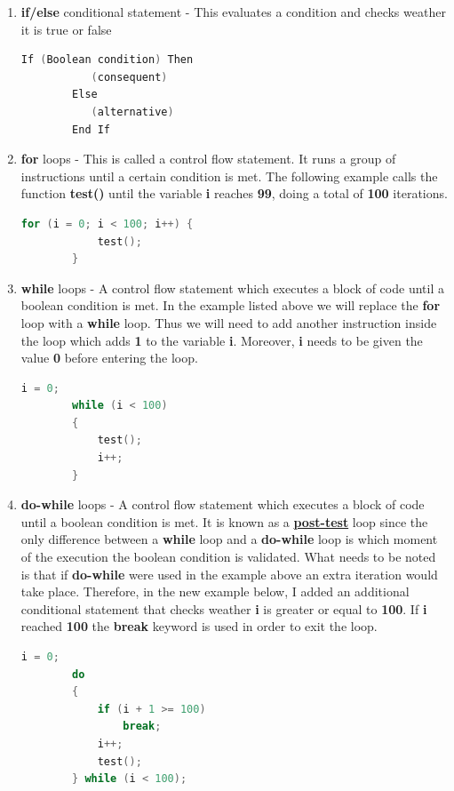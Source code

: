 \documentclass[12pt]{article}
\begin{document}
\begin{enumerate}
    \item \textbf{if/else} conditional statement - This evaluates a condition and checks weather it is true or false
    \begin{lstlisting}[language=C]
        If (Boolean condition) Then
           (consequent)
        Else
           (alternative)
        End If
    \end{lstlisting}

    \item \textbf{for} loops - This is called a control flow statement. It runs a group of instructions until a certain condition is met. The following example calls the function \textbf{test()} until the variable \textbf{i} reaches \textbf{99}, doing a total of \textbf{100} iterations.
    \begin{lstlisting}[language=C]
        for (i = 0; i < 100; i++) {
            test();
        }
    \end{lstlisting}

    \item \textbf{while} loops - A control flow statement which executes a block of code until a boolean condition is met. In the example listed above we will replace the \textbf{for} loop with a \textbf{while} loop. Thus we will need to add another instruction inside the loop which adds \textbf{1} to the variable \textbf{i}. Moreover, \textbf{i} needs to be given the value \textbf{0} before entering the loop.
    \begin{lstlisting}[language=C]
        i = 0;
        while (i < 100)
        {
            test();
            i++;
        }
    \end{lstlisting}

    \item \textbf{do-while} loops - A control flow statement which executes a block of code until a boolean condition is met. It is known as a \textbf{\underline{post-test}} loop since the only difference between a \textbf{while} loop and a \textbf{do-while} loop is which moment of the execution the boolean condition is validated. What needs to be noted is that if \textbf{do-while} were used in the example above an extra iteration would take place. Therefore, in the new example below, I added an additional conditional statement that checks weather \textbf{i} is greater or equal to \textbf{100}. If \textbf{i} reached \textbf{100} the \textbf{break} keyword is used in order to exit the loop.
    \begin{lstlisting}[language=C]
        i = 0;
        do
        {   
            if (i + 1 >= 100)
                break;
            i++;
            test();
        } while (i < 100);
    \end{lstlisting}
\end{enumerate}
\end{document}
